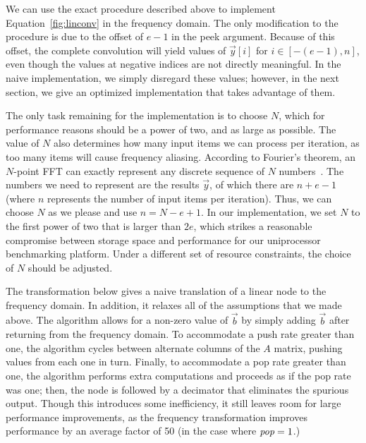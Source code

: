 We can use the exact procedure described above to implement
Equation~\ref{fig:linconv} in the frequency domain.  The only
modification to the procedure is due to the offset of $e-1$ in the
peek argument.  Because of this offset, the complete convolution will
yield values of ${\vec y}[i]$ for $i \in [-(e-1), n]$, even though the
values at negative indices are not directly meaningful.  In the naive
implementation, we simply disregard these values; however, in the next
section, we give an optimized implementation that takes advantage of
them.

The only task remaining for the implementation is to choose $N$, which
for performance reasons should be a power of two, and as large as
possible.  The value of $N$ also determines how many input items we
can process per iteration, as too many items will cause frequency
aliasing.  According to Fourier's theorem, an $N$-point FFT can
exactly represent any discrete sequence of $N$
numbers~\cite{oppenheim-discrete}.  The numbers we need to represent
are the results ${\vec y}$, of which there are $n+e-1$ (where $n$
represents the number of input items per iteration).  Thus, we can
choose $N$ as we please and use $n = N-e+1$.  In our implementation,
we set $N$ to the first power of two that is larger than $2e$, which
strikes a reasonable compromise between storage space and performance
for our uniprocessor benchmarking platform.  Under a different set of
resource constraints, the choice of $N$ should be adjusted.

The transformation below gives a naive translation of a linear node to
the frequency domain.  In addition, it relaxes all of the assumptions
that we made above.  The algorithm allows for a non-zero value of
${\vec b}$ by simply adding ${\vec b}$ after returning from the
frequency domain.  To accommodate a push rate greater than one, the
algorithm cycles between alternate columns of the $A$ matrix, pushing
values from each one in turn.  Finally, to accommodate a pop rate
greater than one, the algorithm performs extra computations and
proceeds as if the pop rate was one; then, the node is followed by a
decimator that eliminates the spurious output.  Though this introduces
some inefficiency, it still leaves room for large performance
improvements, as the frequency transformation improves performance by
an average factor of 50 (in the case where $\mbox{\it pop}=1$.)

